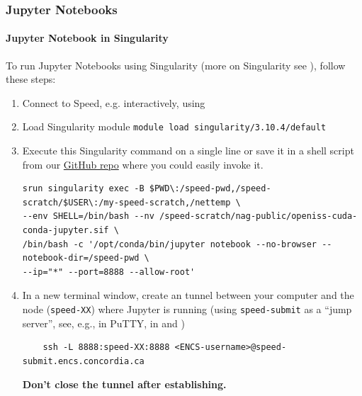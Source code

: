\subsubsection{Jupyter Notebooks}
\label{sect:jupyter-notebooks}

\paragraph{Jupyter Notebook in Singularity}
\label{sect:jupyter-singularity}
\noindent To run Jupyter Notebooks using Singularity (more on Singularity see ),
follow these steps:

\begin{enumerate}
\item Connect to Speed, e.g. interactively, using 
\item Load Singularity module
    \verb+module load singularity/3.10.4/default+

\item Execute this Singularity command on a single line or save it in a shell script from our
\href{https://github.com/NAG-DevOps/speed-hpc/blob/master/src/jupyter.sh}{GitHub repo}
where you could easily invoke it.

\small
\begin{verbatim}
srun singularity exec -B $PWD\:/speed-pwd,/speed-scratch/$USER\:/my-speed-scratch,/nettemp \
--env SHELL=/bin/bash --nv /speed-scratch/nag-public/openiss-cuda-conda-jupyter.sif \
/bin/bash -c '/opt/conda/bin/jupyter notebook --no-browser --notebook-dir=/speed-pwd \
--ip="*" --port=8888 --allow-root'
\end{verbatim}
\normalsize

\item In a new terminal window, create an  tunnel between your computer and the node (\texttt{speed-XX}) where Jupyter is
running (using \texttt{speed-submit} as a ``jump server'', see, e.g., in PuTTY, in  and )
\small
\begin{verbatim}
    ssh -L 8888:speed-XX:8888 <ENCS-username>@speed-submit.encs.concordia.ca
\end{verbatim}
\normalsize
\textbf{Don't close the tunnel after establishing.}


\end{enumerate}
